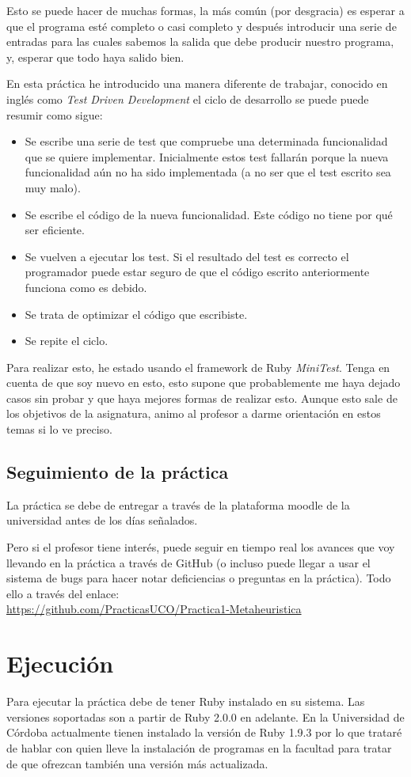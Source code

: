 \documentclass[12pt,a4paper,draft,openany]{article}
\begin{document}
Esto se puede hacer de muchas formas, la más común (por desgracia) es esperar a que el programa esté completo o casi completo y después introducir una serie de entradas para las cuales sabemos la salida que debe producir nuestro programa, y, esperar que todo haya salido bien.

En esta práctica he introducido una manera diferente de trabajar, conocido en inglés como \emph{Test Driven Development} el ciclo de desarrollo se puede puede resumir como sigue:
\begin{itemize}
\item Se escribe una serie de test que compruebe una determinada funcionalidad que se quiere implementar. Inicialmente estos test fallarán porque la nueva funcionalidad aún no ha sido implementada (a no ser que el test escrito sea muy malo).
\item Se escribe el código de la nueva funcionalidad. Este código no tiene por qué ser eficiente.
\item Se vuelven a ejecutar los test. Si el resultado del test es correcto el programador puede estar seguro de que el código escrito anteriormente funciona como es debido.
\item Se trata de optimizar el código que escribiste.
\item Se repite el ciclo.
\end{itemize}

Para realizar esto, he estado usando el framework de Ruby \emph{MiniTest}. Tenga en cuenta de que soy nuevo en esto, esto supone que probablemente me haya dejado casos sin probar y que haya mejores formas de realizar esto. Aunque esto sale de los objetivos de la asignatura, animo al profesor a darme orientación en estos temas si lo ve preciso.

\subsection{Seguimiento de la práctica}
La práctica se debe de entregar a través de la plataforma moodle de la universidad antes de los días señalados. 

Pero si el profesor tiene interés, puede seguir en tiempo real los avances que voy llevando en la práctica a través de GitHub (o incluso puede llegar a usar el sistema de bugs para hacer notar deficiencias o preguntas en la práctica).
Todo ello a través del enlace: \\ \url{https://github.com/PracticasUCO/Practica1-Metaheuristica}

\section{Ejecución}
Para ejecutar la práctica debe de tener Ruby instalado en su sistema. Las versiones soportadas son a partir de Ruby 2.0.0 en adelante. En la Universidad de Córdoba actualmente tienen instalado la versión de Ruby 1.9.3 por lo que trataré de hablar con quien lleve la instalación de programas en la facultad para tratar de que ofrezcan también una versión más actualizada.
\end{document}
